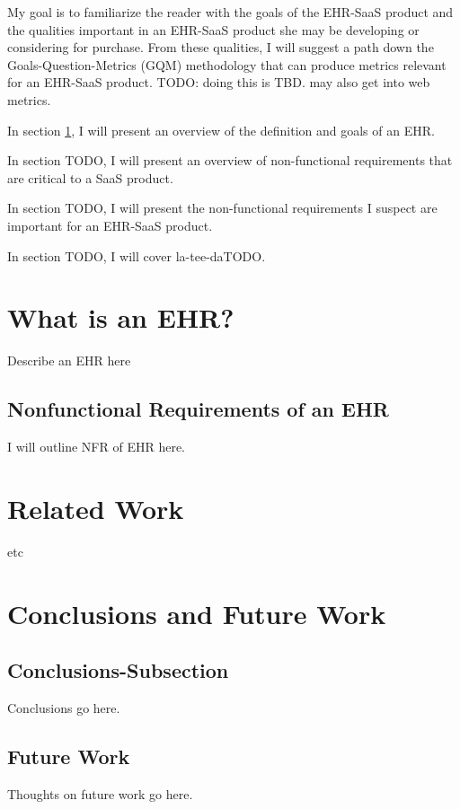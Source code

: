 \documentclass[10pt]{article}
\begin{document}
My goal is to familiarize the reader with the goals of the EHR-SaaS product and the qualities important in an EHR-SaaS product
she may be developing or considering for purchase.
From these qualities, I will suggest a path down the Goals-Question-Metrics (GQM) methodology that can produce metrics relevant for an EHR-SaaS product.
TODO: doing this is TBD. may also get into web metrics.

In section \ref{sec:What is an EHR}, I will present an overview of the definition and goals of an EHR.

In section TODO, I will present an overview of non-functional requirements that are critical to a SaaS product.

In section TODO, I will present the non-functional requirements I suspect are important for an EHR-SaaS product.

In section TODO, I will cover la-tee-daTODO.

\section{What is an EHR?}
\label{sec:What is an EHR}
Describe an EHR here \cite{auditingprivacy}


\subsection{Nonfunctional Requirements of an EHR}
\label{sec:Nonfunctional Requirements of an EHR}
I will outline NFR of EHR here.

\section{Related Work}
\label{sec:Related}
etc

\section{Conclusions and Future Work}

\subsection{Conclusions-Subsection}
\label{sec:Conclusions-Subsection}

Conclusions go here. 

\subsection{Future Work}
\label{sec:Future Work}
Thoughts on future work go here.



\end{document}
